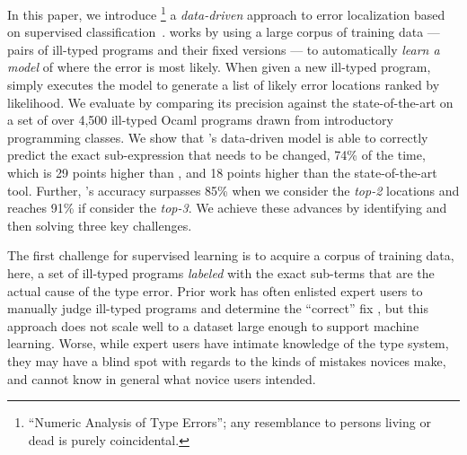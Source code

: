 %
In this paper, we introduce \toolname
\footnote{``Numeric Analysis of Type Errors''; any resemblance to persons living or dead is purely coincidental.}
a \emph{data-driven} approach to error
localization based on supervised
classification~\citep{Kotsiantis2007-pj}.
%
\toolname works by using a large corpus
of training data --- pairs of ill-typed
programs and their fixed versions ---
to automatically \emph{learn a model}
of where the error is most likely.
%
When given a new ill-typed program,
\toolname simply executes the model
to generate a list of likely error
locations ranked by likelihood.
%
We evaluate \toolname by comparing its
precision against the state-of-the-art
on a set of over 4,500 ill-typed Ocaml
programs drawn from introductory
programming classes.
%
We show that \toolname's data-driven
model is able to correctly predict
the exact sub-expression that needs to
be changed, 74\% of the time, which is
29 points higher than \ocaml, and
18 points higher than the state-of-the-art
\sherrloc tool.
%
Further, \toolname's accuracy surpasses
85\% when we consider the \emph{top-2}
locations and reaches 91\% if consider
the \emph{top-3}.
%
We achieve these advances by identifying
and then solving three key challenges.

%
The first challenge for supervised learning
is to acquire a corpus of training data, here,
a set of ill-typed programs \emph{labeled}
with the exact sub-terms that are the actual
cause of the type error.
%
Prior work has often enlisted expert users
to manually judge ill-typed programs and
determine the ``correct'' fix \citep[\eg][]{Loncaric2016-uk},
but this approach does not scale well to
a dataset large enough to support machine
learning.
%
Worse, while expert users have intimate
knowledge of the type system, they may
have a blind spot with regards to the
kinds of mistakes novices make, and
cannot know in general what novice users
intended.

